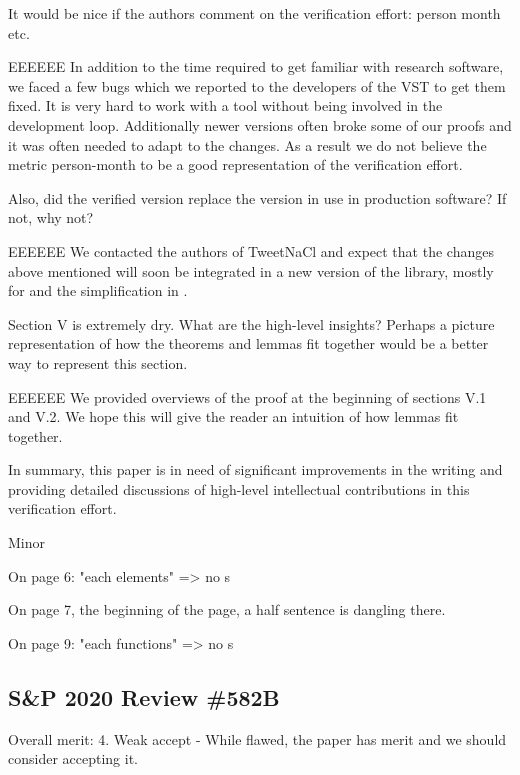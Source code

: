 It would be nice if the authors comment on the verification
effort: person month etc.

\begin{answer}{EEEEEE}
In addition to the time required to get familiar with
research software, we faced a few bugs which we reported
to the developers of the VST to get them fixed.
It is very hard to work with a tool without being involved
in the development loop. Additionally newer versions often
broke some of our proofs and it was often needed to adapt
to the changes.
As a result we do not believe the metric person-month to be
a good representation of the verification effort.
\end{answer}

Also, did the verified version replace the version in use in
production software? If not, why not?

\begin{answer}{EEEEEE}
We contacted the authors of TweetNaCl and expect that
the changes above mentioned will soon be integrated in a
new version of the library, mostly for  and the
simplification in .
\end{answer}

Section V is extremely dry. What are the high-level insights?
Perhaps a picture representation of how the theorems
and lemmas fit together would be a better way to represent
this section.

\begin{answer}{EEEEEE}
We provided overviews of the proof at the beginning of sections
V.1 and V.2. We hope this will give the reader an intuition
of how lemmas fit together.
\end{answer}

In summary, this paper is in need of significant improvements
in the writing and providing detailed discussions of
high-level intellectual contributions in this verification effort.

{\color{gray}
Minor

On page 6: "each elements" => no s

On page 7, the beginning of the page, a half sentence is
dangling there.

On page 9: "each functions" => no s}


\subsection{S\&P 2020 Review \#582B}

Overall merit: 4. Weak accept - While flawed, the paper has
merit and we should consider accepting it.


